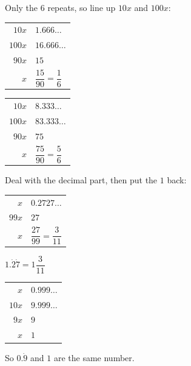 \documentclass[aspectratio=169]{beamer}
\makeatletter
\newcommand{\work}[1]{%
  \begin{tabular}{@{}r@{\;=\;}l@{}}#1\end{tabular}%
}
\makeatother
\begin{document}
  {Only the $6$ repeats, so line up $10x$ and $100x$:\\[0.4em]
   \work{$10x$ & $1.666\ldots$ \\[0.2em]
         $100x$ & $16.666\ldots$ \\[0.2em]
         $90x$ & $15$ \\[0.2em]
         $x$ & $\dfrac{15}{90}=\dfrac{1}{6}$}}

  {\work{$10x$ & $8.333\ldots$ \\[0.2em]
         $100x$ & $83.333\ldots$ \\[0.2em]
         $90x$ & $75$ \\[0.2em]
         $x$ & $\dfrac{75}{90}=\dfrac{5}{6}$}}

  {Deal with the decimal part, then put the $1$ back:\\[0.4em]
   \work{$x$ & $0.2727\ldots$ \\[0.2em]
         $99x$ & $27$ \\[0.2em]
         $x$ & $\dfrac{27}{99}=\dfrac{3}{11}$}
   \par\vspace{0.4em}
   $1.\dot{2}\dot{7}=1\dfrac{3}{11}$}

  {\work{$x$ & $0.999\ldots$ \\[0.2em]
         $10x$ & $9.999\ldots$ \\[0.2em]
         $9x$ & $9$ \\[0.2em]
         $x$ & $1$}
   \par\vspace{0.4em}
   So $0.\dot{9}$ and $1$ are the same number.}
\end{document}
